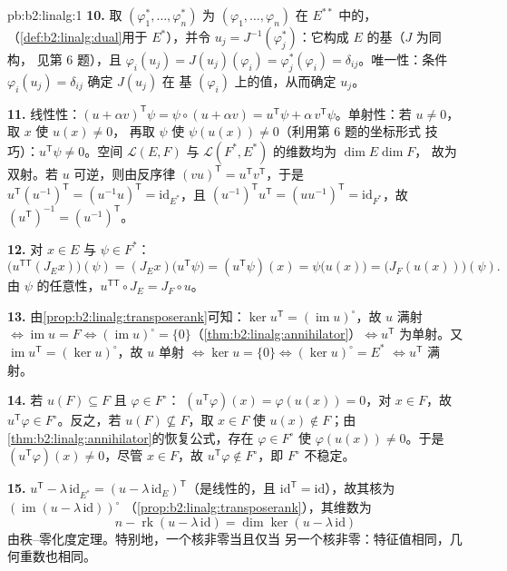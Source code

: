 \begin{solution}{pb:b2:linalg:1}
\textbf{10.} 取 $(\varphi_1^*, \dots,
\varphi_n^*)$ 为 $(\varphi_1, \dots, \varphi_n)$ 在 $E^{**}$ 中的，
（\cref{def:b2:linalg:dual}用于 $E^*$），并令 $u_j =
J^{-1}(\varphi_j^*)$：它构成 $E$ 的基（$J$ 为同构，
见第 6 题），且 $\varphi_i(u_j) = J(u_j)(\varphi_i) =
\varphi_j^*(\varphi_i) = \delta_{ij}$。唯一性：条件
$\varphi_i(u_j) = \delta_{ij}$ 确定 $J(u_j)$ 在
基 $(\varphi_i)$ 上的值，从而确定 $u_j$。

\textbf{11.} 线性性：$(u + \alpha v)^{\mathsf T}\psi = \psi
\circ (u + \alpha v) = u^{\mathsf T}\psi + \alpha\, v^{\mathsf
T}\psi$。单射性：若 $u \neq 0$，取 $x$ 使 $u(x) \neq 0$，
再取 $\psi$ 使 $\psi(u(x)) \neq 0$（利用第 6 题的坐标形式
技巧）：$u^{\mathsf T}\psi \neq 0$。空间 $\mathcal{L}(E,F)$
与 $\mathcal{L}(F^*, E^*)$ 的维数均为 $\dim E \dim F$，
故为双射。若 $u$ 可逆，则由反序律 $(vu)^{\mathsf
T} = u^{\mathsf T}v^{\mathsf T}$，于是 $u^{\mathsf
T}(u^{-1})^{\mathsf T} = (u^{-1}u)^{\mathsf T} =
\mathrm{id}_{E^*}$，且 $(u^{-1})^{\mathsf T}u^{\mathsf T} =
(uu^{-1})^{\mathsf T} = \mathrm{id}_{F^*}$，故 $(u^{\mathsf
T})^{-1} = (u^{-1})^{\mathsf T}$。

\textbf{12.} 对 $x \in E$ 与 $\psi \in F^*$：
\[
\bigl(u^{\mathsf T\mathsf T}(J_E x)\bigr)(\psi)
= (J_E x)\bigl(u^{\mathsf T}\psi\bigr)
= (u^{\mathsf T}\psi)(x)
= \psi\bigl(u(x)\bigr)
= \bigl(J_F(u(x))\bigr)(\psi).
\]
由 $\psi$ 的任意性，$u^{\mathsf T\mathsf T} \circ J_E = J_F
\circ u$。

\textbf{13.} 由\cref{prop:b2:linalg:transposerank}可知：$\ker
u^{\mathsf T} = (\operatorname{im} u)^\circ$，故 $u$ 满射
$\iff \operatorname{im} u = F \iff (\operatorname{im}u)^\circ =
\{0\}$（\cref{thm:b2:linalg:annihilator}）$\iff u^{\mathsf T}$
为单射。又 $\operatorname{im} u^{\mathsf T} = (\ker
u)^\circ$，故 $u$ 单射 $\iff \ker u = \{0\} \iff (\ker
u)^\circ = E^*$ $\iff u^{\mathsf T}$ 满射。

\textbf{14.} 若 $u(F) \subseteq F$ 且 $\varphi \in F^\circ$：
$(u^{\mathsf T}\varphi)(x) = \varphi(u(x)) = 0$，对 $x \in F$，故
$u^{\mathsf T}\varphi \in F^\circ$。反之，若 $u(F)
\not\subseteq F$，取 $x \in F$ 使 $u(x) \notin F$；由
\cref{thm:b2:linalg:annihilator}的恢复公式，存在
$\varphi \in F^\circ$ 使 $\varphi(u(x)) \neq 0$。于是
$(u^{\mathsf T}\varphi)(x) \neq 0$，尽管 $x \in F$，故
$u^{\mathsf T}\varphi \notin F^\circ$，即 $F^\circ$ 不稳定。

\textbf{15.} $u^{\mathsf T} - \lambda\,\mathrm{id}_{E^*} = (u -
\lambda\,\mathrm{id}_E)^{\mathsf T}$（是线性的，且
$\mathrm{id}^{\mathsf T} = \mathrm{id}$），故其核为
$(\operatorname{im}(u - \lambda\,\mathrm{id}))^\circ$
（\cref{prop:b2:linalg:transposerank}），其维数为
\[
n - \operatorname{rk}(u - \lambda\,\mathrm{id})
= \dim\ker(u - \lambda\,\mathrm{id})
\]
由秩--零化度定理。特别地，一个核非零当且仅当
另一个核非零：特征值相同，几何重数也相同。


\end{solution}
